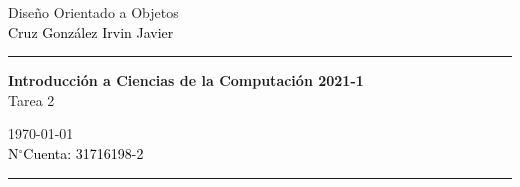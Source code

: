 \documentclass[a4paper,10pt]{article}
\begin{document}
\fancyhead[C]{}
\begin{minipage}{0.295\textwidth} 
\raggedright
Diseño Orientado a Objetos\\    
\footnotesize 
\colorbox[rgb]{1.0, 0.5, 0.0}{\textcolor{black}{Cruz González Irvin Javier}}
\textcolor{electricyellow}{\medskip\hrule}
\end{minipage}
\begin{minipage}{0.4\textwidth} 
\centering 
\large 
\textbf{Introducción a Ciencias de la Computación 2021-1}\\ 
\normalsize 
Tarea 2\\
\end{minipage}
\begin{minipage}{0.295\textwidth} 
\raggedleft
\today\\ 
\footnotesize
\colorbox[rgb]{0.0, 0.98, 0.6}{\textcolor{black}{N$^{\circ}$Cuenta: 31716198-2}}
\textcolor{electricyellow}{\medskip\hrule}
\end{minipage}
\end{document}
